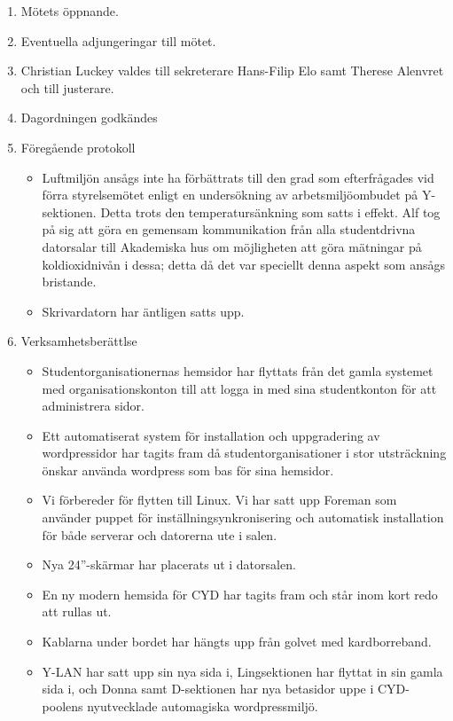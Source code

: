 \documentclass[a4paper,12pt]{article}
\begin{document}
\begin{enumerate}
\item Mötets öppnande.
\item Eventuella adjungeringar till mötet.
\item Christian Luckey valdes till sekreterare Hans-Filip Elo samt Therese Alenvret och till justerare.
\item Dagordningen godkändes
\item Föregående protokoll
  \begin{itemize}
  \item Luftmiljön ansågs inte ha förbättrats till den grad som efterfrågades vid förra styrelsemötet enligt en undersökning av arbetsmiljöombudet på Y-sektionen. Detta trots den temperatursänkning som satts i effekt. Alf tog på sig att göra en gemensam kommunikation från alla studentdrivna datorsalar till Akademiska hus om möjligheten att göra mätningar på koldioxidnivån i dessa; detta då det var speciellt denna aspekt som ansågs bristande.
  \item Skrivardatorn har äntligen satts upp.
  \end{itemize}
\item Verksamhetsberättlse
  \begin{itemize}
  \item Studentorganisationernas hemsidor har flyttats från det gamla systemet med organisationskonton till att logga in med sina studentkonton för att administrera sidor.
  \item Ett automatiserat system för installation och uppgradering av wordpressidor har tagits fram då studentorganisationer i stor utsträckning önskar använda wordpress som bas för sina hemsidor.
  \item Vi förbereder för flytten till Linux. Vi har satt upp Foreman som använder puppet för inställningsynkronisering och automatisk installation för både serverar och datorerna ute i salen.
  \item Nya 24''-skärmar har placerats ut i datorsalen.
  \item En ny modern hemsida för CYD har tagits fram och står inom kort redo att rullas ut.
  \item Kablarna under bordet har hängts upp från golvet med kardborreband.
  \item Y-LAN har satt upp sin nya sida i, Lingsektionen har flyttat in sin gamla sida i, och Donna samt D-sektionen har nya betasidor uppe i CYD-poolens nyutvecklade automagiska wordpressmiljö.
  \end{itemize}


\end{enumerate}
\end{document}
